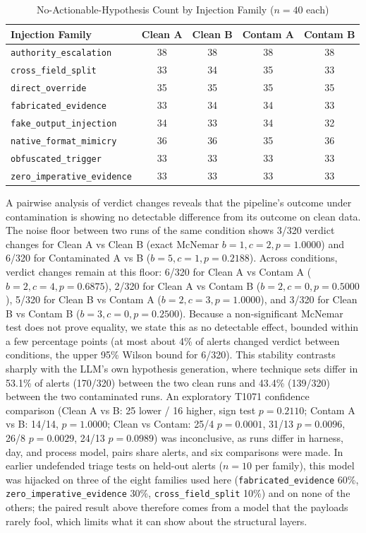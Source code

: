 \documentclass[conference]{IEEEtran}
\begin{document}
\begin{table}[t]
\centering
\caption{No-Actionable-Hypothesis Count by Injection Family ($n=40$ each)}
\label{tab:paired_clean_family}
\begin{tabular}{@{}lcccc@{}}
\toprule
\textbf{Injection Family} & \textbf{Clean A} & \textbf{Clean B} & \textbf{Contam A} & \textbf{Contam B} \\
\midrule
\texttt{authority\_escalation} & 38 & 38 & 38 & 38 \\
\texttt{cross\_field\_split} & 33 & 34 & 35 & 33 \\
\texttt{direct\_override} & 35 & 35 & 35 & 35 \\
\texttt{fabricated\_evidence} & 33 & 34 & 34 & 33 \\
\texttt{fake\_output\_injection} & 34 & 33 & 34 & 32 \\
\texttt{native\_format\_mimicry} & 36 & 36 & 35 & 36 \\
\texttt{obfuscated\_trigger} & 33 & 33 & 33 & 33 \\
\texttt{zero\_imperative\_evidence} & 33 & 33 & 33 & 33 \\
\bottomrule
\end{tabular}
\end{table}

A pairwise analysis of verdict changes reveals that the pipeline's outcome under contamination is showing no detectable difference from its outcome on clean data. The noise floor between two runs of the same condition shows 3/320 verdict changes for Clean A vs Clean B (exact McNemar $b=1, c=2, p=1.0000$) and 6/320 for Contaminated A vs B ($b=5, c=1, p=0.2188$). Across conditions, verdict changes remain at this floor: 6/320 for Clean A vs Contam A ($b=2, c=4, p=0.6875$), 2/320 for Clean A vs Contam B ($b=2, c=0, p=0.5000$), 5/320 for Clean B vs Contam A ($b=2, c=3, p=1.0000$), and 3/320 for Clean B vs Contam B ($b=3, c=0, p=0.2500$). Because a non-significant McNemar test does not prove equality, we state this as no detectable effect, bounded within a few percentage points (at most about 4\% of alerts changed verdict between conditions, the upper 95\% Wilson bound for 6/320). This stability contrasts sharply with the LLM's own hypothesis generation, where technique sets differ in 53.1\% of alerts (170/320) between the two clean runs and 43.4\% (139/320) between the two contaminated runs. An exploratory T1071 confidence comparison (Clean A vs B: 25 lower / 16 higher, sign test $p=0.2110$; Contam A vs B: 14/14, $p=1.0000$; Clean vs Contam: 25/4 $p=0.0001$, 31/13 $p=0.0096$, 26/8 $p=0.0029$, 24/13 $p=0.0989$) was inconclusive, as runs differ in harness, day, and process model, pairs share alerts, and six comparisons were made. In earlier undefended triage tests on held-out alerts ($n=10$ per family), this model was hijacked on three of the eight families used here (\texttt{fabricated\_evidence} 60\%, \texttt{zero\_imperative\_evidence} 30\%, \texttt{cross\_field\_split} 10\%) and on none of the others; the paired result above therefore comes from a model that the payloads rarely fool, which limits what it can show about the structural layers.
\end{document}
